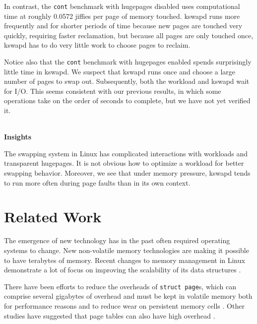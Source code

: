 \documentclass[twocolumn,11pt]{article}
\begin{document}
In contrast, the \texttt{cont} benchmark with hugepages disabled uses
computational time at roughly 0.0572 jiffies per page of memory touched.
kswapd runs more frequently and for shorter periods of time because new pages
are touched very quickly, requiring faster reclamation, but because all pages
are only touched once, kswapd has to do very little work to choose pages to
reclaim.

Notice also that the \texttt{cont} benchmark with hugepages enabled spends
surprisingly little time in kswapd. We suspect that kswapd runs once and choose
a large number of pages to swap out. Subsequently, both the workload and kswapd
wait for I/O. This seems consistent with our previous results, in which some
operations take on the order of seconds to complete, but we have not yet
verified it.

~\\ \textbf{Insights} 

The swapping system in Linux has complicated interactions with workloads and
transparent hugepages. It is not obvious how to optimize a workload for better
swapping behavior. Moreover, we see that under memory pressure, kswapd tends to
run more often during page faults than in its own context.

\section{Related Work}


The emergence of new technology has in the past often required operating systems
to change. New non-volatile memory technologies are making it possible to have
terabytes of memory. Recent changes to memory management in Linux demonstrate a
lot of focus on improving the scalability of its data structures
\cite{huang2016evolutionary}. 

There have been efforts to reduce the
overheads of \texttt{struct page}s, which can comprise several gigabytes of
overhead and must be kept in volatile memory both for performance reasons and to
reduce wear on persistent memory cells \cite{corbet_persistent_progress,
struct_page}. Other studies have suggested that page tables can also have high
overhead \cite{simics}.
\end{document}
